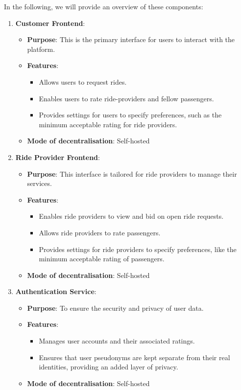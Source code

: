 In the following, we will provide an overview of these components:

\begin{enumerate}
    \item \textbf{Customer Frontend}:
    \begin{itemize}
        \item \textbf{Purpose}: This is the primary interface for users to interact with the platform.
        \item \textbf{Features}:
        \begin{itemize}
            \item Allows users to request rides.
            \item Enables users to rate ride-providers and fellow passengers.
            \item Provides settings for users to specify preferences, such as the minimum acceptable rating for ride providers.
        \end{itemize}
        \item \textbf{Mode of decentralisation}: Self-hosted 
    \end{itemize}

    \item \textbf{Ride Provider Frontend}:
    \begin{itemize}
        \item \textbf{Purpose}: This interface is tailored for ride providers to manage their services.
        \item \textbf{Features}:
        \begin{itemize}
            \item Enables ride providers to view and bid on open ride requests.
            \item Allows ride providers to rate passengers.
            \item Provides settings for ride providers to specify preferences, like the minimum acceptable rating of passengers.
        \end{itemize}
        \item \textbf{Mode of decentralisation}: Self-hosted 
    \end{itemize}

    \item \textbf{Authentication Service}:
    \begin{itemize}
        \item \textbf{Purpose}: To ensure the security and privacy of user data.
        \item \textbf{Features}:
        \begin{itemize}
            \item Manages user accounts and their associated ratings.
            \item Ensures that user pseudonyms are kept separate from their real identities, providing an added layer of privacy.
        \end{itemize}
        \item \textbf{Mode of decentralisation}: Self-hosted 
    \end{itemize}


\end{enumerate}
